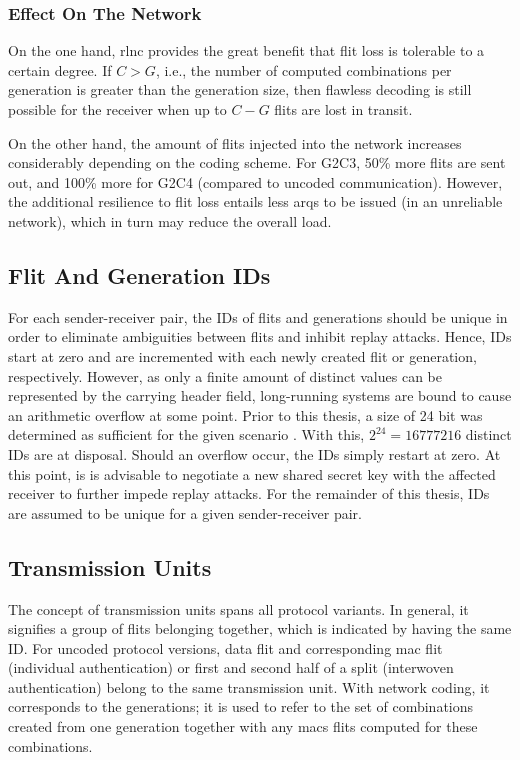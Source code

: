 \subsubsection{Effect On The Network}
On the one hand, \gls{rlnc} provides the great benefit that flit loss is tolerable to a certain degree. If $C > G$, i.e., the number of computed
combinations per generation is greater than the generation size, then flawless decoding is still possible for the receiver when up to $C - G$ flits
are lost in transit.

On the other hand, the amount of flits injected into the network increases considerably depending on the coding scheme. For G2C3, 50\% more flits are
sent out, and 100\% more for G2C4 (compared to uncoded communication). However, the additional resilience to flit loss entails less \glspl{arq} to be
issued (in an unreliable network), which in turn may reduce the overall load.

\subsection{Flit And Generation IDs}
For each sender-receiver pair, the IDs of flits and generations should be unique in order to eliminate ambiguities between flits and inhibit replay
attacks. Hence, IDs start at zero and are incremented with each newly created flit or generation, respectively. However, as only a finite amount of
distinct values can be represented by the carrying header field, long-running systems are bound to cause an arithmetic overflow at some point. Prior
to this thesis, a size of 24 bit was determined as sufficient for the given scenario \cite[5]{franz18authdraft}. With this, $2^{24} = \num{16777216}$
distinct IDs are at disposal. Should an overflow occur, the IDs simply restart at zero. At this point, is is advisable to negotiate a new shared
secret key with the affected receiver to further impede replay attacks. For the remainder of this thesis, IDs are assumed to be unique for a given
sender-receiver pair.

\subsection{Transmission Units}
The concept of transmission units spans all protocol variants. In general, it signifies a group of flits belonging together, which is indicated by
having the same ID. For uncoded protocol versions, data flit and corresponding \gls{mac} flit (individual authentication) or first and second half of a
split (interwoven authentication) belong to the same transmission unit. With network coding, it corresponds to the generations; it is used to refer to
the set of combinations created from one generation together with any \glspl{mac} flits computed for these combinations.

